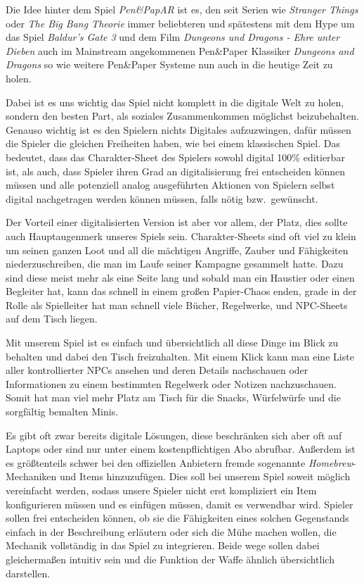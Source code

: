 Die Idee hinter dem Spiel \textit{Pen\&PapAR} ist es, den seit Serien wie
\textit{Stranger Things} oder \textit{The Big Bang Theorie} immer beliebteren und
spätestens mit dem Hype um das Spiel \textit{Baldur's Gate 3} und dem Film
\textit{Dungeons und Dragons - Ehre unter Dieben} auch im Mainstream angekommenen
Pen\&Paper Klassiker \textit{Dungeons and Dragons} so wie weitere Pen\&Paper Systeme nun
auch in die heutige Zeit zu holen.\newblock

Dabei ist es uns wichtig das Spiel nicht komplett in die digitale Welt zu holen, sondern
den besten Part, als soziales Zusammenkommen möglichst beizubehalten.
Genauso wichtig ist es den Spielern nichts Digitales aufzuzwingen, dafür müssen
die Spieler die gleichen Freiheiten haben, wie bei einem klassischen Spiel.
Das bedeutet, dass das Charakter-Sheet des Spielers sowohl digital 100\% editierbar ist,
als auch, dass Spieler ihren Grad an digitalisierung frei entscheiden können müssen und
alle potenziell analog ausgeführten Aktionen von Spielern selbst digital nachgetragen werden
können müssen, falls nötig bzw.\ gewünscht.\newblock

Der Vorteil einer digitalisierten Version ist aber vor allem, der Platz, dies sollte auch
Hauptaugenmerk unseres Spiels sein.
Charakter-Sheets sind oft viel zu klein um seinen ganzen Loot und all die mächtigen Angriffe,
Zauber und Fähigkeiten niederzuschreiben, die man im Laufe seiner Kampagne gesammelt hatte.
Dazu sind diese meist mehr als eine Seite lang und sobald man ein Haustier oder einen Begleiter
hat, kann das schnell in einem großen Papier-Chaos enden, grade in der Rolle als Spielleiter
hat man schnell viele Bücher, Regelwerke, und NPC-Sheets auf dem Tisch liegen.\newblock

Mit unserem Spiel ist es einfach und übersichtlich all diese Dinge im Blick zu behalten und
dabei den Tisch freizuhalten.
Mit einem Klick kann man eine Liste aller kontrollierter NPCs
ansehen und deren Details nachschauen oder Informationen zu einem bestimmten Regelwerk oder Notizen
nachzuschauen.
Somit hat man viel mehr Platz am Tisch für die Snacks, Würfelwürfe und die sorgfältig bemalten
Minis.\newblock

Es gibt oft zwar bereits digitale Lösungen, diese beschränken sich aber oft auf Laptops
oder sind nur unter einem kostenpflichtigen Abo abrufbar.
Außerdem ist es größtenteils schwer bei den offiziellen Anbietern fremde sogenannte \textit{Homebrew}-Mechaniken
und Items hinzuzufügen.
Dies soll bei unserem Spiel soweit möglich vereinfacht werden, sodass unsere Spieler nicht erst kompliziert
ein Item konfigurieren müssen und es einfügen müssen, damit es verwendbar wird.
Spieler sollen frei entscheiden können, ob sie die Fähigkeiten eines solchen Gegenstands einfach
in der Beschreibung erläutern oder sich die Mühe machen wollen, die Mechanik vollständig in das
Spiel zu integrieren.
Beide wege sollen dabei gleichermaßen intuitiv sein und die Funktion der Waffe ähnlich
übersichtlich darstellen.\newblock

